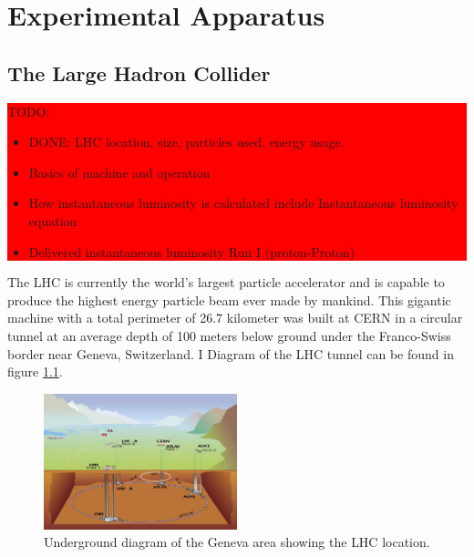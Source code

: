 \chapter{Experimental Apparatus}
\label{CHAPTER:ExperimentalApparatus}

\section{The Large Hadron Collider}
\label{SECTION:ExperimentalApparatus_LHC}

\colorbox{red}{
\begin{minipage}{0.95\linewidth}
TODO: 

\begin{itemize}
  \item DONE: LHC location, size, particles used, energy usage.
  \item Basics of machine and operation
  \item How instantaneous luminosity is calculated include Instantaneous luminosity equation
  \item Delivered instantaneous luminosity Run I (proton-Proton)
\end{itemize}

\end{minipage}
}

The \gls{LHC}\cite{ARTICLE:LHC Machine} is currently the world's largest particle accelerator and is capable to produce the highest energy particle beam ever made by mankind. This gigantic machine with a total perimeter of 26.7 kilometer was built at \gls{CERN} in a circular tunnel at an average depth of 100 meters below ground under the Franco-Swiss border near Geneva, Switzerland. I Diagram of the LHC tunnel can be found in figure \ref{FIGURE:ExperimentalApparatus_LHCLayoutUnderground}.

\begin{figure}[!htb]
  \centering
  \includegraphics[width=0.50\textwidth]{Chapter02/LHC/Images/LHC_layout_underground.jpg}
  \caption{Underground diagram of the Geneva area showing the \gls{LHC} location.}
  \label{FIGURE:ExperimentalApparatus_LHCLayoutUnderground}
\end{figure}

